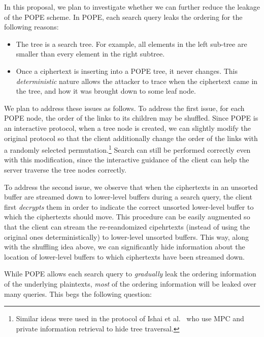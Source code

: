 In this proposal, we plan to investigate whether we can further reduce the
leakage of the POPE scheme. 
%
In POPE, each search query leaks the ordering  for the following reasons: 

\begin{itemize}\setlength\itemsep{0em}
\item The tree is a search tree. For example, all elements in the
  left sub-tree are smaller than every element in the right subtree.
 
\item Once a ciphertext is inserting into a POPE tree, it never changes. This {\em
  deterministic} nature allows the attacker to trace when the ciphertext came
  in the tree, and how it was brought down to some leaf node.  
\end{itemize}

We plan to address these issues as follows. To address the first issue, for
each POPE node, the order of the links to its children may be shuffled. Since
POPE is an interactive protocol, when a tree node is created, we can slightly
modify the original protocol so that the client additionally change the order
of the links with a randomly selected permutation.\footnote{Similar ideas were used in the protocol of Ishai et al.~\cite{RSA:IKLO16} who use MPC and private information retrieval to hide tree traversal.}
%
Search can still be performed correctly even with this
modification, since the interactive guidance of the client can help the server
traverse the tree nodes correctly. 
    
To address the second issue, we observe that when the ciphertexts in an
unsorted buffer are streamed down to lower-level buffers during a search query,
the client first {\em decrypts} them in order to indicate the correct unsorted
lower-level buffer to which the ciphertexts should move. This procedure can be
easily augmented so that the client can stream the {re-reandomized cipehrtexts}
(instead of using the original ones deterministically) to lower-level unsorted
buffers. This way, along with the shuffling idea above, we can significantly
hide information about the location of lower-level buffers to which ciphertexts
have been streamed down. 

While POPE allows each search query to {\it gradually} leak the ordering
information of the underlying plaintexts, {\em most} of the ordering
information will be leaked over many queries. This begs the following question: 

